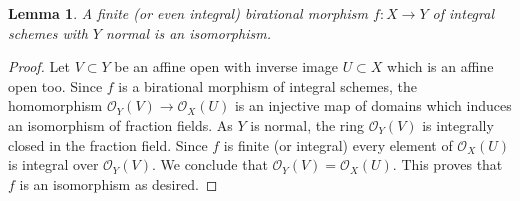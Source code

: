\documentclass[10pt,a4paper]{amsart}
\theoremstyle{plain}
\newtheorem{lemma}[subsection]{Lemma}
\theoremstyle{definition}
\theoremstyle{remark}
\numberwithin{equation}{subsection}
\begin{document}
\begin{lemma}
\label{lemma-finite-birational-over-normal}
A finite (or even integral) birational morphism $f : X \to Y$
of integral schemes with $Y$ normal is an isomorphism.
\end{lemma}

\begin{proof}
Let $V \subset Y$ be an affine open
with inverse image $U \subset X$ which is an affine open too.
Since $f$ is a birational morphism of integral schemes, the homomorphism
$\mathcal{O}_Y(V) \to \mathcal{O}_X(U)$ is an injective map of domains
which induces an isomorphism of fraction fields. As $Y$ is normal,
the ring $\mathcal{O}_Y(V)$ is integrally closed in the fraction field.
Since $f$ is finite (or integral) every element of $\mathcal{O}_X(U)$
is integral over $\mathcal{O}_Y(V)$. We conclude that
$\mathcal{O}_Y(V) = \mathcal{O}_X(U)$. This proves that $f$ is an
isomorphism as desired.
\end{proof}
\end{document}
